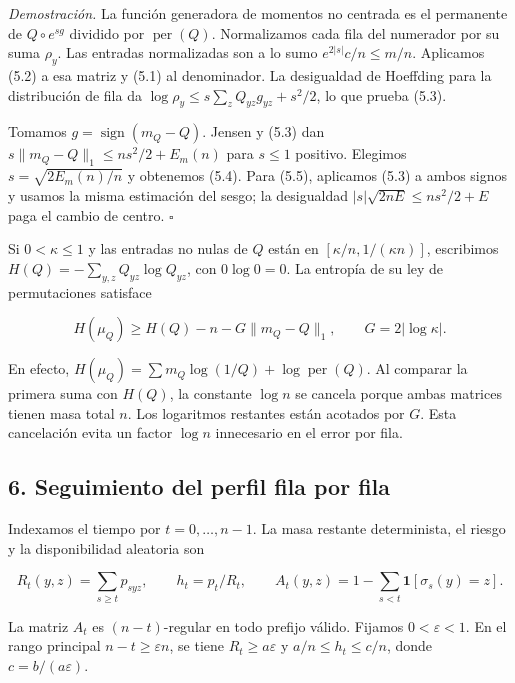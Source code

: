 \documentclass[spanish,11pt,a4paper]{article}
\begin{document}
\emph{Demostración.} La función generadora de momentos no centrada es el permanente de \(Q\circ e^{sg}\) dividido por \(\operatorname{per}(Q)\). Normalizamos cada fila del numerador por su suma \(\rho_y\). Las entradas normalizadas son a lo sumo \(e^{2|s|}c/n\le m/n\). Aplicamos (5.2) a esa matriz y (5.1) al denominador. La desigualdad de Hoeffding para la distribución de fila da \(\log\rho_y\le s\sum_zQ_{yz}g_{yz}+s^2/2\), lo que prueba (5.3).

Tomamos \(g=\operatorname{sign}(m_Q-Q)\). Jensen y (5.3) dan \(s\|m_Q-Q\|_1\le ns^2/2+E_m(n)\) para \(s\le1\) positivo. Elegimos \(s=\sqrt{2E_m(n)/n}\) y obtenemos (5.4). Para (5.5), aplicamos (5.3) a ambos signos y usamos la misma estimación del sesgo; la desigualdad \(|s|\sqrt{2nE}\le ns^2/2+E\) paga el cambio de centro. \(\square\)

Si \(0<\kappa\le1\) y las entradas no nulas de \(Q\) están en \([\kappa/n,1/(\kappa n)]\), escribimos \(H(Q)=-\sum_{y,z}Q_{yz}\log Q_{yz}\), con \(0\log0=0\). La entropía de su ley de permutaciones satisface

\nopagebreak[4]
\[H(\mu_Q)\ge H(Q)-n-G\|m_Q-Q\|_1,\qquad G=2|\log\kappa|.\tag{5.6}\]

En efecto, \(H(\mu_Q)=\sum m_Q\log(1/Q)+\log\operatorname{per}(Q)\). Al comparar la primera suma con \(H(Q)\), la constante \(\log n\) se cancela porque ambas matrices tienen masa total \(n\). Los logaritmos restantes están acotados por \(G\). Esta cancelación evita un factor \(\log n\) innecesario en el error por fila.

\subsection{6. Seguimiento del perfil fila por fila}\label{seguimiento-del-perfil-fila-por-fila}

Indexamos el tiempo por \(t=0,\ldots,n-1\). La masa restante determinista, el riesgo y la disponibilidad aleatoria son

\nopagebreak[4]
\[R_t(y,z)=\sum_{s\ge t}p_{syz},\qquad h_t=p_t/R_t,\qquad
A_t(y,z)=1-\sum_{s<t}\mathbf1[\sigma_s(y)=z].\tag{6.1}\]

La matriz \(A_t\) es \((n-t)\)-regular en todo prefijo válido. Fijamos \(0<\varepsilon<1\). En el rango principal \(n-t\ge\varepsilon n\), se tiene \(R_t\ge a\varepsilon\) y \(a/n\le h_t\le c/n\), donde \(c=b/(a\varepsilon)\).
\end{document}
